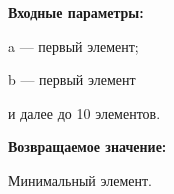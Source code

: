 \textbf{Входные параметры:}

 a --- первый элемент;
	
 b --- первый элемент
 
 и далее до 10 элементов.

\textbf{Возвращаемое значение:}

Минимальный элемент.